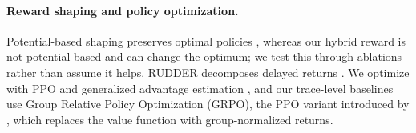 \paragraph{Reward shaping and policy optimization.}
Potential-based shaping preserves optimal policies \citep{ng1999shaping}, whereas our hybrid reward is not potential-based and can change the optimum; we test this through ablations rather than assume it helps.
RUDDER decomposes delayed returns \citep{arjona2019rudder}.
We optimize with PPO and generalized advantage estimation \citep{schulman2017ppo,schulman2016gae}, and our trace-level baselines use Group Relative Policy Optimization (GRPO), the PPO variant introduced by \citet{shao2024deepseekmath}, which replaces the value function with group-normalized returns.
